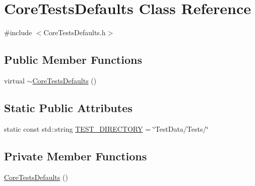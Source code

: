 \hypertarget{class_core_tests_defaults}{
\section{CoreTestsDefaults Class Reference}
\label{class_core_tests_defaults}
}


{\ttfamily \#include $<$CoreTestsDefaults.h$>$}

\subsection*{Public Member Functions}
\begin{DoxyCompactItemize}
\item 
virtual \hyperlink{class_core_tests_defaults_a34f48ea5b64f852fdd44ac4d378df6e8}{$\sim$CoreTestsDefaults} ()
\end{DoxyCompactItemize}
\subsection*{Static Public Attributes}
\begin{DoxyCompactItemize}
\item 
static const std::string \hyperlink{class_core_tests_defaults_aa543f63f7c94e1f66868b318c72f4b59}{TEST\_\-DIRECTORY} = \char`\"{}TestData/Tests/\char`\"{}
\end{DoxyCompactItemize}
\subsection*{Private Member Functions}
\begin{DoxyCompactItemize}
\item 
\hyperlink{class_core_tests_defaults_a861acd8b537c1880c86b9a00e4ec5100}{CoreTestsDefaults} ()
\end{DoxyCompactItemize}


